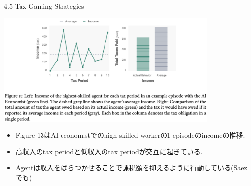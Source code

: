 \documentclass[unicode,aspectratio=169,11pt]{beamer}
\begin{document}
\begin{frame}{4.5 Tax-Gaming Strategies}{}
    \begin{center}
        \includegraphics[width=11cm]{figure13.png}
    \end{center}
    {\footnotesize\begin{itemize}
        \item Figure 13はAI economistでのhigh-skilled workerの1 episodeのincomeの推移.
        \item 高収入のtax periodと低収入のtax periodが交互に起きている.
        \item Agentは収入をばらつかせることで課税額を抑えるように行動している(Saezでも)
    \end{itemize}}
\end{frame}
\end{document}
